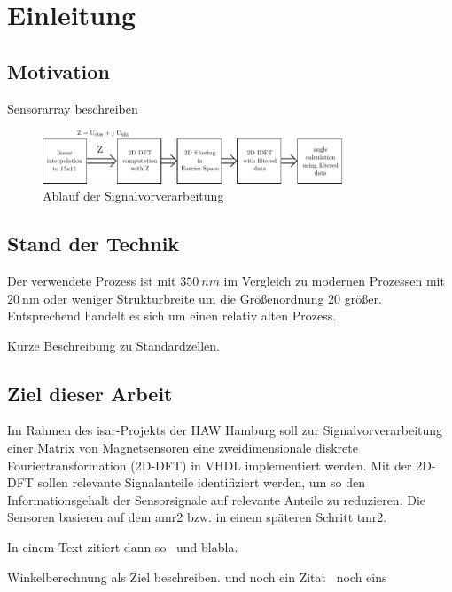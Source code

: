 \chapter{Einleitung}
 \section{Motivation}
Sensorarray beschreiben

\begin{figure}[ht!]
 \centering
 \includegraphics[width=0.8\textwidth]{img/AblaufFourier.pdf}
 \caption{Ablauf der Signalvorverarbeitung~\autocite[9]{krrts2017freqfilt}}
 \label{pic:AblaufFourier}
\end{figure}


\section{Stand der Technik}
Der verwendete Prozess ist mit $\SI{350}{nm}$ im Vergleich zu modernen Prozessen mit $\SI{20}{\nm}$ oder weniger Strukturbreite um die Größenordnung 20 größer. Entsprechend handelt es 
sich um einen relativ alten Prozess.

Kurze Beschreibung zu Standardzellen.


\section{Ziel dieser Arbeit}
Im Rahmen des \gls{isar}-Projekts der HAW Hamburg soll zur Signalvorverarbeitung einer Matrix von Magnetsensoren  eine 
zweidimensionale diskrete Fouriertransformation (2D-DFT) in VHDL implementiert werden. Mit der 
2D-DFT sollen relevante Signalanteile identifiziert werden, um so den Informationsgehalt der Sensorsignale auf relevante Anteile zu reduzieren. Die Sensoren basieren auf 
dem \gls{amr2} bzw. in einem späteren Schritt \gls{tmr2}.

In einem Text zitiert dann so~\autocite[10-20]{krey2015systemarchitektur} und blabla.

Winkelberechnung als Ziel beschreiben. und noch ein Zitat~\autocite[8-9]{krrts2017freqfilt} noch eins~\autocite[1-2]{sabotta2013Masterthesis}

